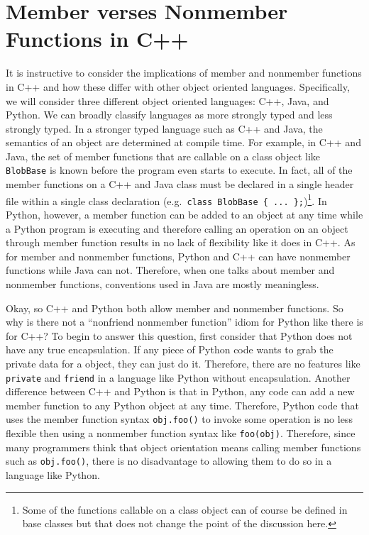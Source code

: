 \documentclass[pdf,ps2pdf,11pt]{SANDreport}
\begin{document}
%
\section{Member verses Nonmember Functions in C++}
%

It is instructive to consider the implications of member and nonmember
functions in C++ and how these differ with other object oriented languages.
Specifically, we will consider three different object oriented languages: C++,
Java, and Python.  We can broadly classify languages as more strongly typed
and less strongly typed.  In a stronger typed language such as C++ and Java,
the semantics of an object are determined at compile time.  For example, in
C++ and Java, the set of member functions that are callable on a class object
like {}\texttt{BlobBase} is known before the program even starts to execute.
In fact, all of the member functions on a C++ and Java class must be declared
in a single header file within a single class declaration (e.g.\
{}\texttt{class BlobBase \{ ... \};})\footnote{Some of the functions callable
on a class object can of course be defined in base classes but that does not
change the point of the discussion here.}.  In Python, however, a member
function can be added to an object at any time while a Python program is
executing and therefore calling an operation on an object through member
function results in no lack of flexibility like it does in C++.  As for member
and nonmember functions, Python and C++ can have nonmember functions while
Java can not.  Therefore, when one talks about member and nonmember functions,
conventions used in Java are mostly meaningless.

Okay, so C++ and Python both allow member and nonmember functions. So why is
there not a ``nonfriend nonmember function'' idiom for Python like there is
for C++?  To begin to answer this question, first consider that Python does
not have any true encapsulation.  If any piece of Python code wants to grab
the private data for a object, they can just do it.  Therefore, there are no
features like {}\texttt{private} and {}\texttt{friend} in a language like
Python without encapsulation.  Another difference between C++ and Python is
that in Python, any code can add a new member function to any Python object at
any time.  Therefore, Python code that uses the member function syntax
{}\texttt{obj.foo()} to invoke some operation is no less flexible then using a
nonmember function syntax like {}\texttt{foo(obj)}.  Therefore, since many
programmers think that object orientation means calling member functions such
as {}\texttt{obj.foo()}, there is no disadvantage to allowing them to do so in
a language like Python.
\end{document}
